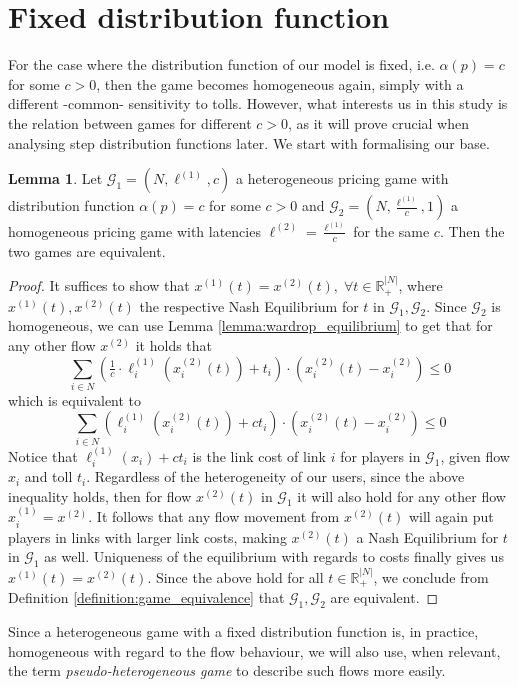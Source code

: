\documentclass[10pt,a4paper]{book}
\newcommand{\R}{\mathbb{R}}
\newcommand{\Gm}{\mathcal{G}}
\theoremstyle{definition}
\newtheorem{lemma}[definition]{Lemma}
\theoremstyle{comment}
\begin{document}
\section{Fixed distribution function}

For the case where the distribution function of our model is fixed, i.e. $\alpha(p) = c$ for some $c > 0$, then the game becomes homogeneous again, simply with a different -common- sensitivity to tolls.
However, what interests us in this study is the relation between games for different $c > 0$, as it will prove crucial when analysing step distribution functions later.
We start with formalising our base.

\begin{lemma}
	\label{lemma:a_fixed_homogeneous}
	Let $\Gm_1 = (N, \ell^{(1)}, c)$ a heterogeneous pricing game with distribution function $\alpha(p) = c$ for some $c > 0$ and $\Gm_2 = (N, \frac{\ell^{(1)}}{c}, 1)$ a homogeneous pricing game with latencies $\ell^{(2)} = \frac{\ell^{(1)}}{c}$ for the same $c$.
	Then the two games are equivalent.
\end{lemma}

\begin{proof}
	It suffices to show that $x^{(1)}(t) = x^{(2)}(t), \; \forall t \in \R_+^{|N|}$, where $x^{(1)}(t), x^{(2)}(t)$ the respective Nash Equilibrium for $t$ in $\Gm_1, \Gm_2$.
	Since $\Gm_2$ is homogeneous, we can use Lemma \ref{lemma:wardrop_equilibrium} to get that for any other flow $x^{(2)}$ it holds that
	\[
		\sum_{i \in N} \left(\tfrac1c \cdot \ell_i^{(1)}(x_i^{(2)}(t)) + t_i\right) \cdot \left(x_i^{(2)}(t) - x_i^{(2)}\right) \leq 0
	\]
	which is equivalent to
	\[
		\sum_{i \in N} \left(\ell_i^{(1)}(x_i^{(2)}(t)) + c t_i\right) \cdot \left(x_i^{(2)}(t) - x_i^{(2)}\right) \leq 0
	\]
	Notice that $\ell_i^{(1)}(x_i) + c t_i$ is the link cost of link $i$ for players in $\Gm_1$, given flow $x_i$ and toll $t_i$.
	Regardless of the heterogeneity of our users, since the above inequality holds, then for flow $x^{(2)}(t)$ in $\Gm_1$ it will also hold for any other flow $x_i^{(1)} = x^{(2)}$.
	It follows that any flow movement from $x^{(2)}(t)$ will again put players in links with larger link costs, making $x^{(2)}(t)$ a Nash Equilibrium for $t$ in $\Gm_1$ as well.
	Uniqueness of the equilibrium with regards to costs finally gives us $x^{(1)}(t) = x^{(2)}(t)$.
	Since the above hold for all $t \in \R_+^{|N|}$, we conclude from Definition \ref{definition:game_equivalence} that $\Gm_1, \Gm_2$ are equivalent.
\end{proof}
Since a heterogeneous game with a fixed distribution function is, in practice, homogeneous with regard to the flow behaviour, we will also use, when relevant, the term \textit{pseudo-heterogeneous game} to describe such flows more easily.
\end{document}
